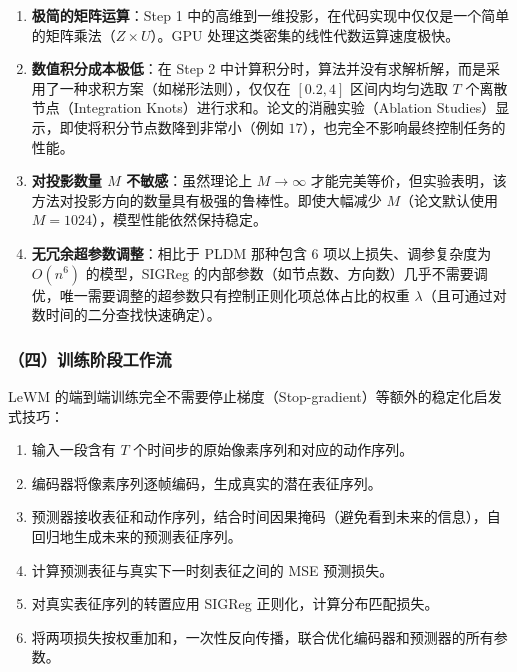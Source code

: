 \begin{enumerate}
\def\labelenumi{\arabic{enumi}.}
\tightlist
\item
  \textbf{极简的矩阵运算}：Step 1 中的高维到一维投影，在代码实现中仅仅是一个简单的矩阵乘法（\(Z\times U\)）。GPU 处理这类密集的线性代数运算速度极快。
\item
  \textbf{数值积分成本极低}：在 Step 2 中计算积分时，算法并没有求解析解，而是采用了一种求积方案（如梯形法则），仅仅在 \([0.2,4]\) 区间内均匀选取 \(T\) 个离散节点（Integration Knots）进行求和。论文的消融实验（Ablation Studies）显示，即使将积分节点数降到非常小（例如 \(17\)），也完全不影响最终控制任务的性能。
\item
  \textbf{对投影数量 \(M\) 不敏感}：虽然理论上 \(M\to\infty\) 才能完美等价，但实验表明，该方法对投影方向的数量具有极强的鲁棒性。即使大幅减少 \(M\)（论文默认使用 \(M=1024\)），模型性能依然保持稳定。
\item
  \textbf{无冗余超参数调整}：相比于 PLDM 那种包含 \(6\) 项以上损失、调参复杂度为 \(O(n^6)\) 的模型，SIGReg 的内部参数（如节点数、方向数）几乎不需要调优，唯一需要调整的超参数只有控制正则化项总体占比的权重 \(\lambda\)（且可通过对数时间的二分查找快速确定）。
\end{enumerate}

\hypertarget{ux56dbux8badux7ec3ux9636ux6bb5ux5de5ux4f5cux6d41}{%
\subsubsection{（四）训练阶段工作流}\label{ux56dbux8badux7ec3ux9636ux6bb5ux5de5ux4f5cux6d41}}

LeWM 的端到端训练完全不需要停止梯度（Stop-gradient）等额外的稳定化启发式技巧：

\begin{enumerate}
\def\labelenumi{\arabic{enumi}.}
\tightlist
\item
  输入一段含有 \(T\) 个时间步的原始像素序列和对应的动作序列。
\item
  编码器将像素序列逐帧编码，生成真实的潜在表征序列。
\item
  预测器接收表征和动作序列，结合时间因果掩码（避免看到未来的信息），自回归地生成未来的预测表征序列。
\item
  计算预测表征与真实下一时刻表征之间的 MSE 预测损失。
\item
  对真实表征序列的转置应用 SIGReg 正则化，计算分布匹配损失。
\item
  将两项损失按权重加和，一次性反向传播，联合优化编码器和预测器的所有参数。
\end{enumerate}

